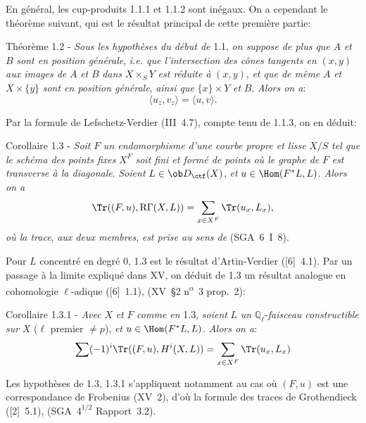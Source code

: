 En général, les cup-produits 1.1.1 et 1.1.2 sont inégaux. On a cependant le théorème suivant, qui est le résultat principal de cette première partie:

\begin{statement}{Théorème 1.2 -}
\emph{Sous les hypothèses du début de} 1.1, \emph{on suppose de plus que} $A$ \emph{et} $B$ \emph{sont en position générale}, \emph{i.e. que l'intersection des cônes tangents en} $(x,y)$ \emph{aux images de} $A$ \emph{et} $B$ \emph{dans} $X\times_S Y$ \emph{est réduite à} $(x,y)$, \emph{et que de même} $A$ \emph{et} $X\times\{y\}$ \emph{sont en position générale}, \emph{ainsi que} $\{x\}\times Y$ \emph{et} $B$. \emph{Alors on a}:
\begin{equation}\tag{1.2.1}
\langle u_z,v_z\rangle=\langle u,v\rangle.
\end{equation}
\end{statement}

Par la
formule de Lefschetz-Verdier (III~4.7), compte tenu de 1.1.3, on en déduit:

\begin{statement}{Corollaire 1.3 -}
\emph{Soit} $F$ \emph{un endomorphisme d'une courbe propre et lisse} $X/S$ \emph{tel que le schéma des points fixes} $X^F$ \emph{soit fini et formé de points où le graphe de} $F$ \emph{est transverse à la diagonale}. \emph{Soient} $L\in\ob D_{\ctf}(X)$, \emph{et} $u\in\Hom(F^*L,L)$. \emph{Alors on a}
\[
\Tr((F,u),\mathrm{R}\Gamma(X,L))=\sum_{x\in X^F}\Tr(u_x,L_x),
\]
\emph{où la trace}, \emph{aux deux membres}, \emph{est prise au sens de} (SGA~6~I~8).
\end{statement}

Pour $L$ concentré en degré $0$, 1.3 est le résultat d'Artin-Verdier ([6]~4.1). Par un passage à la limite expliqué dans XV, on déduit de 1.3 un résultat analogue en cohomologie $\ell$-adique ([6]~1.1), (XV~\S2 n\textsuperscript{o}~3 prop.~2):

\begin{statement}{Corollaire 1.3.1 -}
\emph{Avec} $X$ \emph{et} $F$ \emph{comme en} 1.3, \emph{soient} $L$ \emph{un} $\mathbb{Q}_\ell$-\emph{faisceau constructible sur} $X$ ($\ell$ premier $\ne p$), \emph{et} $u\in\Hom(F^*L,L)$. \emph{Alors on a}:
\[
\sum(-1)^i\Tr((F,u),H^i(X,L))=\sum_{x\in X^F}\Tr(u_x,L_x)
\]
\end{statement}

Les hypothèses de 1.3, 1.3.1 s'appliquent notamment au cas où $(F,u)$ est une correspondance de Frobenius (XV~2), d'où la formule des traces de Grothendieck ([2]~5.1), (SGA~$4^{1/2}$ Rapport~3.2).

